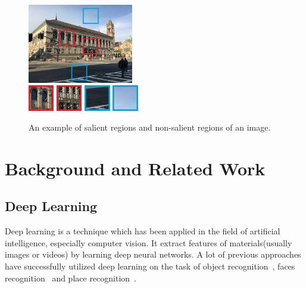 \begin{figure}
\includegraphics[width=0.41\textwidth]{library}
\\[0.1cm]
\includegraphics[width=0.1\textwidth]{library_1}
\includegraphics[width=0.1\textwidth]{library_2}
\includegraphics[width=0.1\textwidth]{library_3}
\includegraphics[width=0.1\textwidth]{library_4}
\caption{An example of salient regions and non-salient regions of an image.}
\label{fig:library}
\end{figure}


\section{Background and Related Work}
\subsection{Deep Learning}
\par
Deep learning is a technique which has been applied in the field of artificial intelligence, especially computer vision. It extract features of materials(usually images or videos) by learning deep neural networks. A lot of previous approaches have successfully utilized deep learning on the task of object recognition~\cite{krizhevsky2012imagenet}, faces recognition~\cite{taigman2014deepface} and place recognition~\cite{zhou2014learning,lin2015learning,Arandjelovic16,workman2015wide,weyand2016planet}. 
